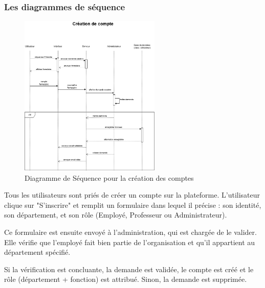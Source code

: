 \documentclass{article}
\begin{document}
\subsubsection{Les diagrammes de séquence}

\begin{figure}[H]
  \centering
  \includegraphics[width=0.6\textwidth]{creationcompte(1.1).drawio.png}
  \caption{Diagramme de Séquence pour la création des comptes}
  \end{figure}
\hspace*{2em} Tous les utilisateurs sont priés de créer un compte sur la plateforme. L’utilisateur clique sur "S’inscrire" et remplit un formulaire dans lequel il précise : son identité, son département, et son rôle (Employé, Professeur ou Administrateur).

\vspace{0,3cm}

\noindent Ce formulaire est ensuite envoyé à l’administration, qui est chargée de le valider. Elle vérifie que l’employé fait bien partie de l’organisation et qu’il appartient au département spécifié.

\vspace{0,3cm}

\noindent Si la vérification est concluante, la demande est validée, le compte est créé et le rôle (département + fonction) est attribué. Sinon, la demande est supprimée.
\end{document}
